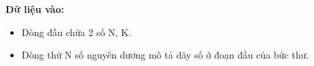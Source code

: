 \textbf{Dữ liệu vào: }
\begin{itemize}
	\item Dòng đầu chứa 2 số N, K.
	\item Dòng thứ N số nguyên dương mô tả dãy số ở đoạn đầu của bức thư.
\end{itemize}